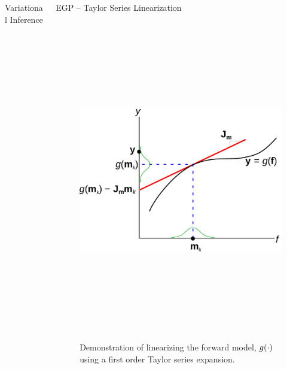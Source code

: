 \documentclass[final]{beamer}
\newlength{\onecolwid}
\newlength{\twocolwid}
\begin{document}
\begin{frame}[t]
\begin{columns}[t]
\begin{column}{\twocolwid}
\begin{columns}[t,totalwidth=\twocolwid]
\begin{column}{\onecolwid}
\begin{block}{Variational Inference}
\end{block}


\end{column} %

\begin{column}{\onecolwid}\vspace{-.6in} %


\begin{block}{EGP -- Taylor Series Linearization}
    
\begin{figure}
    \includegraphics[height=14cm]{fig/taylor}
    \hspace{3cm}
    \caption{Demonstration of linearizing the forward model, $g\!\left({{\cdot}}\right)$
        using a first order Taylor series expansion.}
\end{figure}        


\end{block}
\end{column}
\end{columns}
\end{column}
\end{columns}
\end{frame}
\end{document}
